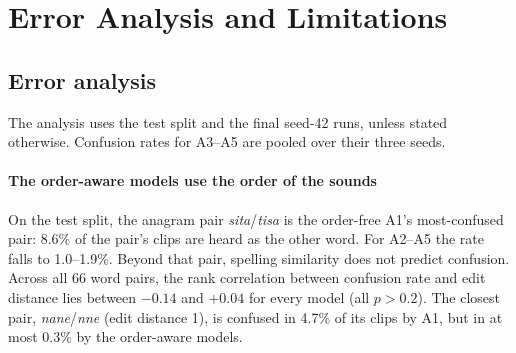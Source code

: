 \section{Error Analysis and Limitations}
\label{sec:errors}

\subsection{Error analysis}
The analysis uses the test split and the final seed-42 runs, unless stated otherwise. Confusion rates for A3--A5 are
pooled over their three seeds.

\paragraph{The order-aware models use the order of the sounds}
On the test split, the anagram pair \textit{sita}/\textit{tisa} is the order-free A1's most-confused pair: 8.6\% of
the pair's clips are heard as the other word. For A2--A5 the rate falls to 1.0--1.9\%. Beyond that pair, spelling
similarity does not predict confusion. Across all 66 word pairs, the rank correlation between confusion rate and edit
distance lies between $-0.14$ and $+0.04$ for every model (all $p>0.2$). The closest pair, \textit{nane}/\textit{nne}
(edit distance 1), is confused in 4.7\% of its clips by A1, but in at most 0.3\% by the order-aware models.

